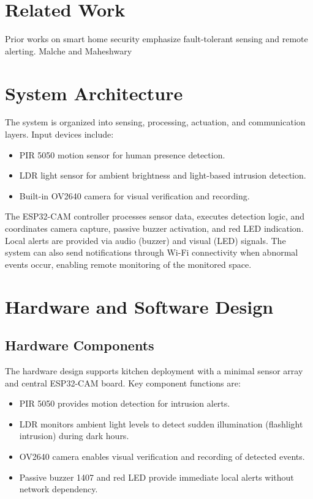 \documentclass[conference]{IEEEtran}
\begin{document}
\section{Related Work}
Prior works on smart home security emphasize fault-tolerant sensing and remote alerting. Malche and Maheshwary %

\section{System Architecture}
The system is organized into sensing, processing, actuation, and communication layers. Input devices include:
\begin{itemize}
  \item PIR 5050 motion sensor for human presence detection.
  \item LDR light sensor for ambient brightness and light-based intrusion detection.
  \item Built-in OV2640 camera for visual verification and recording.
\end{itemize}

The ESP32-CAM controller processes sensor data, executes detection logic, and coordinates camera capture, passive buzzer activation, and red LED indication. Local alerts are provided via audio (buzzer) and visual (LED) signals. The system can also send notifications through Wi-Fi connectivity when abnormal events occur, enabling remote monitoring of the monitored space.

\section{Hardware and Software Design}
\subsection{Hardware Components}
The hardware design supports kitchen deployment with a minimal sensor array and central ESP32-CAM board. Key component functions are:
\begin{itemize}
  \item PIR 5050 provides motion detection for intrusion alerts.
  \item LDR monitors ambient light levels to detect sudden illumination (flashlight intrusion) during dark hours.
  \item OV2640 camera enables visual verification and recording of detected events.
  \item Passive buzzer 1407 and red LED provide immediate local alerts without network dependency.
\end{itemize}
\end{document}
